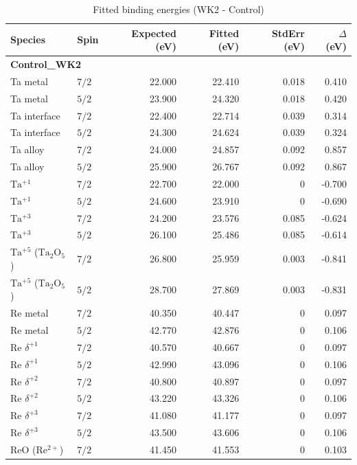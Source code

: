 \documentclass[12pt]{article}
\begin{document}
\begin{table}[H]
\centering
\begin{threeparttable}
\caption{Fitted binding energies (WK2 - Control)}
\begin{tabular}{llrrrr}
\toprule
Species & Spin & Expected (eV) & Fitted (eV) & StdErr (eV) & $\Delta$ (eV) \\
\midrule
\multicolumn{6}{l}{\textbf{Control\_WK2}} \\
Ta metal & $7/2$ & 22.000 & 22.410 & 0.018 & 0.410 \\
Ta metal & $5/2$ & 23.900 & 24.320 & 0.018 & 0.420 \\
Ta interface & $7/2$ & 22.400 & 22.714 & 0.039 & 0.314 \\
Ta interface & $5/2$ & 24.300 & 24.624 & 0.039 & 0.324 \\
Ta alloy & $7/2$ & 24.000 & 24.857 & 0.092 & 0.857 \\
Ta alloy & $5/2$ & 25.900 & 26.767 & 0.092 & 0.867 \\
$\mathrm{Ta^{+1}}$ & $7/2$ & 22.700 & 22.000 & 0 & -0.700 \\
$\mathrm{Ta^{+1}}$ & $5/2$ & 24.600 & 23.910 & 0 & -0.690 \\
$\mathrm{Ta^{+3}}$ & $7/2$ & 24.200 & 23.576 & 0.085 & -0.624 \\
$\mathrm{Ta^{+3}}$ & $5/2$ & 26.100 & 25.486 & 0.085 & -0.614 \\
$\mathrm{Ta^{+5}}$ ($\mathrm{Ta_2O_5}$) & $7/2$ & 26.800 & 25.959 & 0.003 & -0.841 \\
$\mathrm{Ta^{+5}}$ ($\mathrm{Ta_2O_5}$) & $5/2$ & 28.700 & 27.869 & 0.003 & -0.831 \\
Re metal & $7/2$ & 40.350 & 40.447 & 0 & 0.097 \\
Re metal & $5/2$ & 42.770 & 42.876 & 0 & 0.106 \\
$\mathrm{Re}$ $\delta^{+1}$ & $7/2$ & 40.570 & 40.667 & 0 & 0.097 \\
$\mathrm{Re}$ $\delta^{+1}$ & $5/2$ & 42.990 & 43.096 & 0 & 0.106 \\
$\mathrm{Re}$ $\delta^{+2}$ & $7/2$ & 40.800 & 40.897 & 0 & 0.097 \\
$\mathrm{Re}$ $\delta^{+2}$ & $5/2$ & 43.220 & 43.326 & 0 & 0.106 \\
$\mathrm{Re}$ $\delta^{+3}$ & $7/2$ & 41.080 & 41.177 & 0 & 0.097 \\
$\mathrm{Re}$ $\delta^{+3}$ & $5/2$ & 43.500 & 43.606 & 0 & 0.106 \\
$\mathrm{ReO}$ ($\mathrm{Re^{2+}}$) & $7/2$ & 41.450 & 41.553 & 0 & 0.103 \\

\end{tabular}
\end{threeparttable}
\end{table}
\end{document}
